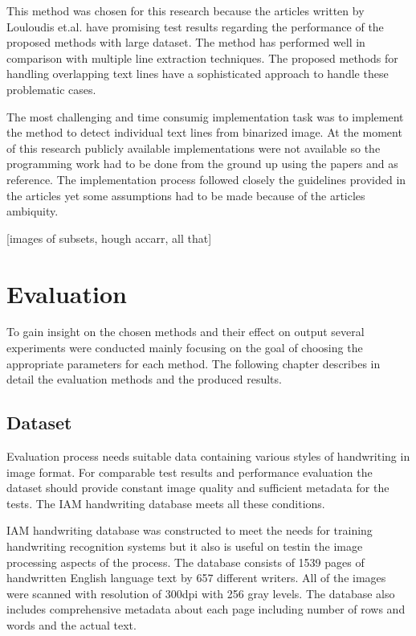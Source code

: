 \documentclass{article}
\begin{document}
          This method was chosen for this research because the articles written by Louloudis et.al. have promising test results regarding the performance of the proposed methods with large dataset. The method has performed well in comparison with multiple line extraction techniques.\cite{Razak} The proposed methods for handling overlapping text lines have a sophisticated approach to handle these problematic cases.

          The most challenging and time consumig implementation task was to implement the method to detect individual text lines from binarized image. At the moment of this research publicly available implementations were not available so the programming work had to be done from the ground up using the papers \cite{Louloudis1} and \cite{Louloudis2} as reference. The implementation process followed closely the guidelines provided in the articles yet some assumptions had to be made because of the articles ambiquity.

          [images of subsets, hough accarr, all that]


  \newpage
  \section{Evaluation}
    To gain insight on the chosen methods and their effect on output several experiments were conducted mainly focusing on the goal of choosing the appropriate parameters for each method. The following chapter describes in detail the evaluation methods and the produced results.

  \subsection{Dataset}
    Evaluation process needs suitable data containing various styles of handwriting in image format. For comparable test results and performance evaluation the dataset should provide constant image quality and sufficient metadata for the tests. The IAM handwriting database meets all these conditions.

    IAM handwriting database was constructed to meet the needs for training handwriting recognition systems but it also is useful on testin the image processing aspects of the process. The database consists of 1539 pages of handwritten English language text by 657 different writers. All of the images were scanned with resolution of 300dpi with 256 gray levels. The database also includes comprehensive metadata about each page including number of rows and words and the actual text. \cite{IAM}
\end{document}
